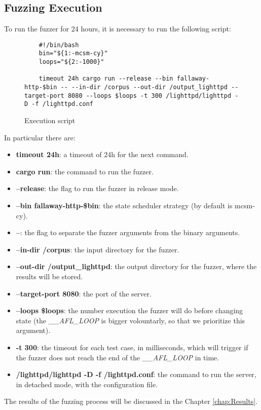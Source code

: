 \subsection{Fuzzing Execution}

To run the fuzzer for 24 hours, it is necessary to run the following script:
\begin{figure}[H]
    \begin{lstlisting}
    #!/bin/bash
    bin="${1:-mcsm-cy}"
    loops="${2:-1000}"

    timeout 24h cargo run --release --bin fallaway-http-$bin -- --in-dir /corpus --out-dir /output_lighttpd --target-port 8080 --loops $loops -t 300 /lighttpd/lighttpd -D -f /lighttpd.conf
    \end{lstlisting}
    \caption{Execution script}
    \label{fig:exec_script_fallaway}
\end{figure}
In particular there are:
\begin{itemize}
    \item \textbf{timeout 24h}: a timeout of 24h for the next command.
    \item \textbf{cargo run}: the command to run the fuzzer.
    \item \textbf{--release}: the flag to run the fuzzer in release mode.
    \item \textbf{--bin fallaway-http-\$bin}: the state scheduler strategy (by default is mcsm-cy).
    \item \textbf{--}: the flag to separate the fuzzer arguments from the binary arguments.
    \item \textbf{--in-dir /corpus}: the input directory for the fuzzer.
    \item \textbf{--out-dir /output\_lighttpd}: the output directory for the fuzzer, where the results will be stored.
    \item \textbf{--target-port 8080}: the port of the server.
    \item \textbf{--loops \$loops}: the number execution the fuzzer will do before changing state (the \textit{\_\_AFL\_LOOP} is bigger volountarly, so that we prioritize this argument).
    \item \textbf{-t 300}: the timeout for each test case, in milliseconds, which will trigger if the fuzzer does not reach the end of the \textit{\_\_AFL\_LOOP} in time.
    \item \textbf{/lighttpd/lighttpd -D -f /lighttpd.conf}: the command to run the server, in detached mode, with the configuration file.
\end{itemize}
The results of the fuzzing process will be discussed in the Chapter \ref{chap:Results}.

